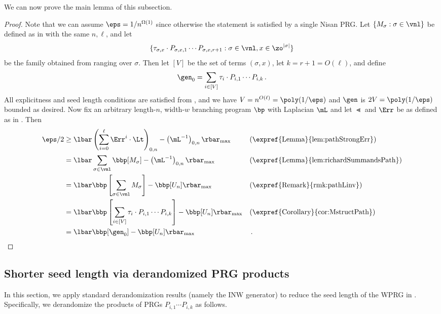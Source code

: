 \documentclass{toc}
\begin{document}
We can now prove the main lemma of this subsection.
\pathRichardson*
\begin{proof}
Note that we can assume $\eps=1/n^{\Omega(1)}$ since otherwise the statement is satisfied by a single Nisan PRG. Let $\{M_\sigma:\sigma \in \vnl\}$ be defined as in  with the same $n,\ell$, and let 
$$\{\tau_{\sigma,x}\cdot P_{\sigma,x,1}\cdots P_{\sigma,x,r+1}:\sigma\in \vnl,x\in \zo^{|\sigma|}\}$$ 
be the family obtained from  ranging over $\sigma$. Then let $[V]$ be the set of terms $(\sigma,x)$, let $k=r+1=O(\ell)$, and define
\[\gen_0=\sum_{i\in[V]}\tau_{i}\cdot P_{i,1}\cdots P_{i,k}\,.\]
All explicitness and seed length conditions are satisfied from , and we have $V=n^{O(\ell)} =\poly(1/\eps)$ and $\gen$ is $2V=\poly(1/\eps)$ bounded as desired.
Now fix an arbitrary length-$n$, width-$w$ branching program $\bp$ with Laplacian $\mL$ and let $\Lt$ and $\Err$ be as defined as in . Then
\begin{align*}
    \eps/2 &\geq \lbar \left(\sum_{i=0}^\ell \Err^i\cdot \Lt\right)_{0,n}-\left(\mL^{-1}\right)_{0,n}\rbar_{\max} && \text{(\expref{Lemma}{lem:pathStrongErr})}\\ 
    &= \lbar\sum_{\sigma \in \vnl}\bbp[M_\sigma]-\left(\mL^{-1}\right)_{0,n}\rbar_{\max} && \text{(\expref{Lemma}{lem:richardSummandsPath})}\\
    &= \lbar\bbp\left[\sum_{\sigma \in \vnl}M_\sigma\right]-\bbp[U_n]\rbar_{\max} && \text{(\expref{Remark}{rmk:pathLinv})}\\
    &= \lbar\bbp\left[\sum_{i \in [V]}\tau_{i}\cdot P_{i,1}\cdots P_{i,k}\right]-\bbp[U_n]\rbar_{\max} && \text{(\expref{Corollary}{cor:MstructPath})}\\
    &= \lbar \bbp[\gen_0] - \bbp[U_n]\rbar_{\max} && \,. \qedhere
\end{align*}
\end{proof}

\subsection{Shorter seed length via derandomized PRG products}
In this section, we apply standard derandomization results (namely the INW generator) to reduce the seed length of the WPRG in . Specifically, we derandomize the products of PRGs $P_{i,1}\cdots P_{i,k}$ as follows. %
\end{document}
